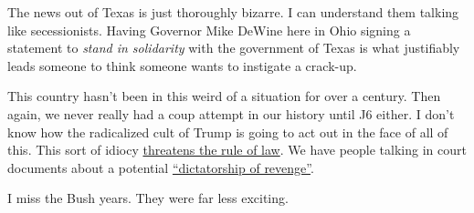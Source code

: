 The news out of Texas is just thoroughly bizarre. I can understand them
talking like secessionists. Having Governor Mike DeWine here in Ohio
signing a statement to \emph{stand in solidarity} with the government of
Texas is what justifiably leads someone to think someone wants to
instigate a crack-up.

This country hasn't been in this weird of a situation for over a
century. Then again, we never really had a coup attempt in our history
until J6 either. I don't know how the radicalized cult of Trump is going
to act out in the face of all of this. This sort of idiocy
\href{https://web.archive.org/web/20240128181919/https://www.thedailybeast.com/texas-border-stunt-is-based-on-a-confederate-legal-theory}{threatens
the rule of law}. We have people talking in court documents about a
potential
\href{https://web.archive.org/web/20240128175023/https://www.theguardian.com/law/2024/jan/28/us-historians-sign-brief-to-support-colorados-removal-of-trump-from-ballot}{``dictatorship
of revenge''}.

I miss the Bush years. They were far less exciting.
